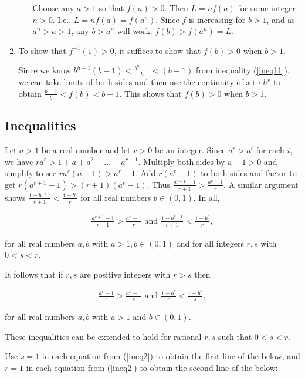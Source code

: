 \begin{enumerate}
\begin{itemize}
        Choose any $a > 1$ so that $f(a) > 0$. Then $L = nf(a)$ for some integer $n > 0$. I.e., $L = nf(a) = f(a^n)$. Since $f$ is increasing for $b > 1$, and as $a^n > a > 1$, any $b > a^n$ will work: $f(b) > f(a^n) = L$.
    \end{itemize}
    \item To show that $f^{-1}(1) > 0$, it suffices to show that $f(b) > 0$ when $b > 1$.
    
    Since we know $b^{h - 1}(b - 1) < \frac{b^h - 1}{h} < (b - 1)$ from inequality (\ref{ineq11}), we can take limits of both sides and then use the continuity of $x \mapsto b^x$ to obtain $\frac{b - 1}{b} < f(b) < b - 1$. This shows that $f(b) > 0$ when $b > 1$.
\end{enumerate}

\subsection*{Inequalities}
    
Let $a > 1$ be a real number and let $r > 0$ be an integer. Since $a^r > a^i$ for each $i$, we have ${ra^r > 1 + a + a^2 + ... + a^{r - 1}}$. Multiply both sides by $a - 1 > 0$ and simplify to see $ra^r(a - 1) > a^r - 1$. Add $r(a^r - 1)$ to both sides and factor to get $r(a^{r + 1} - 1) > (r + 1)(a^r - 1)$. Thus $\frac{a^{r + 1} - 1}{r + 1} > \frac{a^r - 1}{r}$. A similar argument shows $\frac{1 - b^{r + 1}}{r + 1} < \frac{1 - b^r}{r}$ for all real numbers $b \in (0, 1)$. In all,

\begin{align}
    \label{ineq1}
    \frac{a^{r + 1} - 1}{r + 1} > \frac{a^r - 1}{r} \text{ and } \frac{1 - b^{r + 1}}{r + 1} < \frac{1 - b^r}{r},
\end{align} 

for all real numbers $a, b$ with $a > 1, b \in (0, 1)$ and for all integers $r, s$ with $0 < s < r$.

It follows that if $r, s$ are positive integers with $r > s$ then

\begin{align}
    \label{ineq2}
    \frac{a^r - 1}{r} > \frac{a^s - 1}{s} \text{ and } \frac{1 - b^r}{r} < \frac{1 - b^s}{s},
\end{align}

for all real numbers $a, b$ with $a > 1$ and $b \in (0, 1)$. 

These inequalities can be extended to hold for rational $r, s$ such that $0 < s < r$.

Use $s = 1$ in each equation from (\ref{ineq2}) to obtain the first line of the below, and $r = 1$ in each equation from (\ref{ineq2}) to obtain the second line of the below:

